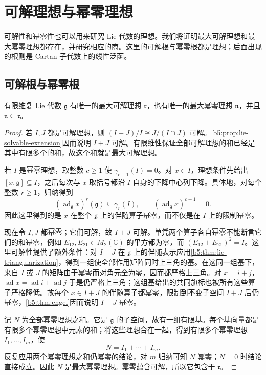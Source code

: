 
\section{可解理想与幂零理想}
\label{b5:sec:1203}

%
%

可解性和幂零性也可以用来研究 Lie 代数的理想。我们将证明最大可解理想和最大幂零理想都存在，并研究相应的商。这里的可解根与幂零根都是理想；后面出现的根则是 Cartan 子代数上的线性泛函。

\subsection{可解根与幂零根}
\label{b5:subsec:1203:01}

\begin{proposition}\label{b5:prop:lie-radicals-exist}
	有限维复 Lie 代数 \(\mathfrak g\) 有唯一的最大可解理想 \(\mathfrak r\)，也有唯一的最大幂零理想 \(\mathfrak n\)，并且 \(\mathfrak n\subseteq\mathfrak r\)。
\end{proposition}
\begin{proof}
	若 \(I,J\) 都是可解理想，则 \((I+J)/I\cong J/(I\cap J)\) 可解。\cref{b5:prop:lie-solvable-extension}因而说明 \(I+J\) 可解。有限维性保证全部可解理想的和已经是其中有限多个的和，故这个和就是最大可解理想。

	若 \(I\) 是幂零理想，取整数 \(c\ge1\) 使 \(\gamma_{c+1}(I)=0\)。对 \(x\in I\)，理想条件先给出 \([x,\mathfrak g]\subseteq I\)，之后每次与 \(x\) 取括号都沿 \(I\) 自身的下降中心列下降。具体地，对每个整数 \(r\ge1\)，归纳得到
	\[
		(\operatorname{ad}_{\mathfrak g}x)^r(\mathfrak g) \subseteq\gamma_r(I),\qquad (\operatorname{ad}_{\mathfrak g}x)^{c+1}=0.
	\]
	因此这里得到的是 \(x\) 在整个 \(\mathfrak g\) 上的伴随算子幂零，而不仅是在 \(I\) 上的限制幂零。

	现在令 \(I,J\) 都幂零；它们可解，故 \(I+J\) 可解。单凭两个算子各自幂零不能断言它们的和幂零，例如 \(E_{12},E_{21}\in M_2(\mathbb C)\) 的平方都为零，而 \((E_{12}+E_{21})^2=I\)。这里可解性提供了额外条件：对 \(I+J\) 在 \(\mathfrak g\) 上的伴随表示应用\cref{b5:thm:lie-triangularization}，得到一组使全部作用矩阵同时上三角的基。在这同一组基下，来自 \(I\) 或 \(J\) 的矩阵由于幂零而对角元全为零，因而都严格上三角。对 \(x=i+j\)，\(\operatorname{ad}x=\operatorname{ad}i+\operatorname{ad}j\) 于是仍严格上三角；这组基给出的共同旗标也被所有这些算子严格降低。故每个 \(x\in I+J\) 的伴随算子都幂零，限制到不变子空间 \(I+J\) 后仍幂零，\cref{b5:thm:engel}因而说明 \(I+J\) 幂零。

	记 \(N\) 为全部幂零理想之和。它是 \(\mathfrak g\) 的子空间，故有一组有限基。每个基向量都是有限多个幂零理想中元素的和；将这些理想合在一起，得到有限多个幂零理想 \(I_1,\ldots,I_m\)，使
	\[
		N=I_1+\cdots+I_m.
	\]
	反复应用两个幂零理想之和仍幂零的结论，对 \(m\) 归纳可知 \(N\) 幂零；\(N=0\) 时结论直接成立。因此 \(N\) 是最大幂零理想。幂零蕴含可解，所以它包含于 \(\mathfrak r\)。
\end{proof}

